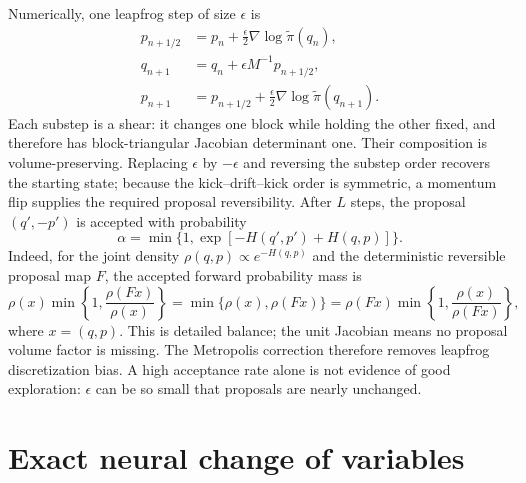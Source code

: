 Numerically, one leapfrog step of size $\epsilon$ is
\begin{align}
 p_{n+1/2}&=p_n+\tfrac\epsilon2\nabla\log\widetilde\pi(q_n),\\
 q_{n+1}&=q_n+\epsilon M^{-1}p_{n+1/2},\\
 p_{n+1}&=p_{n+1/2}+\tfrac\epsilon2
   \nabla\log\widetilde\pi(q_{n+1}).
 \label{eq:bf-neutra-leapfrog}
\end{align}
Each substep is a shear: it changes one block while holding the other fixed,
and therefore has block-triangular Jacobian determinant one.  Their composition
is volume-preserving.  Replacing $\epsilon$ by $-\epsilon$ and reversing the
substep order recovers the starting state; because the kick--drift--kick order
is symmetric, a momentum flip supplies the required proposal reversibility.
After $L$ steps, the proposal $(q',-p')$ is accepted with probability
\begin{equation}
 \alpha=\min\{1,\exp[-H(q',p')+H(q,p)]\}.
 \label{eq:bf-neutra-accept}
\end{equation}
Indeed, for the joint density $\rho(q,p)\propto e^{-H(q,p)}$ and the
deterministic reversible proposal map $F$, the accepted forward probability
mass is
\begin{equation}
 \rho(x)\min\!\left\{1,\frac{\rho(Fx)}{\rho(x)}\right\}
 =\min\{\rho(x),\rho(Fx)\}
 =\rho(Fx)\min\!\left\{1,\frac{\rho(x)}{\rho(Fx)}\right\},
\end{equation}
where $x=(q,p)$.  This is detailed balance; the unit Jacobian means no proposal
volume factor is missing.  The Metropolis correction therefore removes
leapfrog discretization bias.  A high
acceptance rate alone is not evidence of good exploration: $\epsilon$ can be so
small that proposals are nearly unchanged.

\section{Exact neural change of variables}
\label{sec:bf-neutra-change-of-variables}

